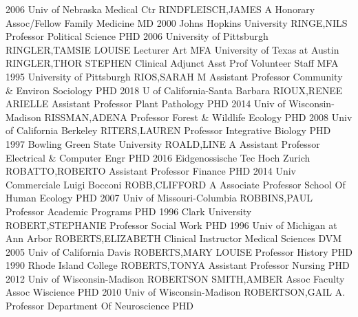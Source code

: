 \documentclass[
]{article}
\begin{document}
2006 Univ of Nebraska Medical Ctr \textbar RINDFLEISCH,JAMES A
\textbar Honorary Assoc/Fellow \textbar{}  \textbar Family
Medicine \textbar MD 2000 Johns Hopkins University \textbar RINGE,NILS
\textbar Professor \textbar{}  \textbar Political Science
\textbar PHD 2006 University of Pittsburgh \textbar RINGLER,TAMSIE
LOUISE \textbar Lecturer \textbar{}  \textbar Art
\textbar MFA University of Texas at Austin \textbar RINGLER,THOR STEPHEN
\textbar Clinical Adjunct Asst Prof \textbar{} 
\textbar Volunteer Staff \textbar MFA 1995 University of Pittsburgh
\textbar RIOS,SARAH M \textbar Assistant Professor \textbar{}
 \textbar Community \& Environ Sociology \textbar PHD 2018 U
of California-Santa Barbara \textbar RIOUX,RENEE ARIELLE
\textbar Assistant Professor \textbar{}  \textbar Plant
Pathology \textbar PHD 2014 Univ of Wisconsin-Madison
\textbar RISSMAN,ADENA \textbar Professor \textbar{} 
\textbar Forest \& Wildlife Ecology \textbar PHD 2008 Univ of California
Berkeley \textbar RITERS,LAUREN \textbar Professor \textbar{}
 \textbar Integrative Biology \textbar PHD 1997 Bowling
Green State University \textbar ROALD,LINE A \textbar Assistant
Professor \textbar{}  \textbar Electrical \& Computer Engr
\textbar PHD 2016 Eidgenossische Tec Hoch Zurich
\textbar ROBATTO,ROBERTO \textbar Assistant Professor \textbar{}
 \textbar Finance \textbar PHD 2014 Univ Commerciale Luigi
Bocconi \textbar ROBB,CLIFFORD A \textbar Associate Professor \textbar{}
 \textbar School Of Human Ecology \textbar PHD 2007 Univ of
Missouri-Columbia \textbar ROBBINS,PAUL \textbar Professor \textbar{}
 \textbar Academic Programs \textbar PHD 1996 Clark
University \textbar ROBERT,STEPHANIE \textbar Professor \textbar{}
 \textbar Social Work \textbar PHD 1996 Univ of Michigan at
Ann Arbor \textbar ROBERTS,ELIZABETH \textbar Clinical Instructor
\textbar{}  \textbar Medical Sciences \textbar DVM 2005 Univ
of California Davis \textbar ROBERTS,MARY LOUISE \textbar Professor
\textbar{}  \textbar History \textbar PHD 1990 Rhode Island
College \textbar ROBERTS,TONYA \textbar Assistant Professor \textbar{}
 \textbar Nursing \textbar PHD 2012 Univ of
Wisconsin-Madison \textbar ROBERTSON SMITH,AMBER \textbar Assoc Faculty
Assoc \textbar{}  \textbar Wiscience \textbar PHD 2010 Univ
of Wisconsin-Madison \textbar ROBERTSON,GAIL A. \textbar Professor
\textbar{}  \textbar Department Of Neuroscience \textbar PHD
\end{document}
